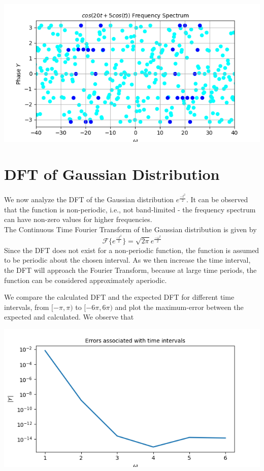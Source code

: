 \documentclass[12pt, a4paper]{report}
\begin{document}
\begin{center}
	\includegraphics[scale=0.72]{Figure_10.png} 
	\label{fig:rawdata}
\end{center}

\section*{DFT of Gaussian Distribution}
We now analyze the DFT of the Gaussian distribution $e^{\frac{-t^2}{2}}$. It can be observed that the function is non-periodic, i.e., not band-limited - the frequency spectrum can have non-zero values for higher frequencies.
\\
The Continuous Time Fourier Transform of the Gaussian distribution is given by 
\begin{equation*}
\mathcal{F}\{e^{\frac{-t^2}{2}}\} = \sqrt{2\pi}e^{\frac{-\omega^2}{2}}
\end{equation*}
Since the DFT does not exist for a non-periodic function, the function is assumed to be periodic about the chosen interval. As we then increase the time interval, the DFT will approach the Fourier Transform, because at large time periods, the function can be considered approximately aperiodic.

We compare the calculated DFT and the expected DFT for different time intervals, from $[-\pi,\pi)$ to $[-6\pi,6\pi)$ and plot the maximum-error between the expected and calculated. We observe that
\clearpage
\begin{center}
	\includegraphics[scale=0.9]{Figure_11.png} 
	\label{fig:rawdata}
\end{center}
\end{document}
